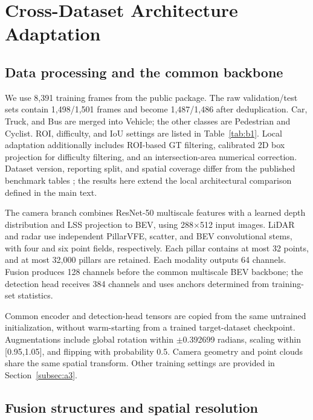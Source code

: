 \section{Cross-Dataset Architecture Adaptation}
\label{app:g}

\subsection{Data processing and the common backbone}
\label{subsec:g1}

We use 8,391 training frames from the public package. The raw validation/test sets contain 1,498/1,501 frames and become 1,487/1,486 after deduplication. Car, Truck, and Bus are merged into Vehicle; the other classes are Pedestrian and Cyclist. ROI, difficulty, and IoU settings are listed in Table~\ref{tab:b1}. Local adaptation additionally includes ROI-based GT filtering, calibrated 2D box projection for difficulty filtering, and an intersection-area numerical correction. Dataset version, reporting split, and spatial coverage differ from the published benchmark tables \citep{yang2025v2xradar}; the results here extend the local architectural comparison defined in the main text.

The camera branch combines ResNet-50 multiscale features with a learned depth distribution and LSS \citep{philion2020lss} projection to BEV, using 288\(\times\)512 input images. LiDAR and radar use independent PillarVFE, scatter, and BEV convolutional stems, with four and six point fields, respectively. Each pillar contains at most 32 points, and at most 32,000 pillars are retained. Each modality outputs 64 channels. Fusion produces 128 channels before the common multiscale BEV backbone; the detection head receives 384 channels and uses anchors determined from training-set statistics.

Common encoder and detection-head tensors are copied from the same untrained initialization, without warm-starting from a trained target-dataset checkpoint. Augmentations include global rotation within \(\pm\)0.392699 radians, scaling within [0.95,1.05], and flipping with probability 0.5. Camera geometry and point clouds share the same spatial transform. Other training settings are provided in Section~\ref{subsec:a3}.

\subsection{Fusion structures and spatial resolution}
\label{subsec:g2}

